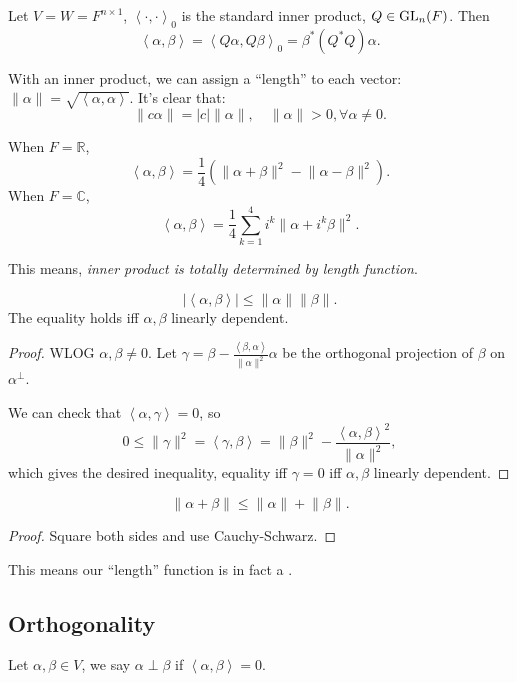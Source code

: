 \begin{example}
    Let $V = W = F^{n\times 1}$, $ \left<\cdot, \cdot \right>_0$ is
	the standard inner product, $Q\in \mathrm{GL}_n(F)$.
	Then
	\[
	\left<\alpha, \beta \right> = \left<Q\alpha, Q\beta \right>_0
	= \beta^*(Q^*Q)\alpha.
	\]
\end{example}

With an inner product, we can assign a ``length''
to each vector: $ \lVert \alpha \rVert = \sqrt{\left<\alpha,\alpha \right>}$.
It's clear that:
\[
\lVert c\alpha \rVert = |c|\lVert \alpha \rVert, \quad
\lVert \alpha \rVert > 0, \forall \alpha \ne 0.
\]

\begin{proposition}
	When $F = \mathbb{R}$,
	\[
	\left<\alpha, \beta \right> = \frac{1}{4}\left(\lVert \alpha + \beta \rVert^2
	- \lVert \alpha - \beta \rVert^2\right).
	\]
	When $F = \mathbb{C}$,
	\[
	\left<\alpha, \beta \right> = \frac{1}{4} \sum_{k=1}^{4} i^k
	\lVert \alpha + i^k \beta \rVert ^2.
	\]
\end{proposition}
\begin{remark}
    This means, \textit{inner product is totally determined by length function}.
\end{remark}

\begin{proposition}
	\[
	|\left<\alpha, \beta \right>| \le \lVert \alpha \rVert \lVert \beta \rVert.
	\]
	The equality holds iff $\alpha, \beta$ linearly dependent.
\end{proposition}
\begin{proof}[Proof]
    WLOG $\alpha, \beta \ne 0$.
	Let $\gamma = \beta -
	\frac{\left<\beta, \alpha \right>}{\lVert \alpha \rVert ^2}\alpha$ be
	the orthogonal projection of $\beta$ on $\alpha^{\perp}$.

	We can check that $ \left<\alpha, \gamma \right> = 0$, so
	\[
	0 \le \lVert \gamma \rVert^2 = \left<\gamma, \beta\right>
	= \lVert \beta \rVert ^2 -
	\frac{\left<\alpha, \beta \right>^2}{\lVert \alpha \rVert ^2},
	\]
	which gives the desired inequality,
	equality iff $\gamma = 0$ iff $\alpha, \beta$ linearly dependent.
\end{proof}

\begin{proposition}
	\[
	\lVert \alpha + \beta \rVert \le \lVert \alpha \rVert + \lVert \beta \rVert.
	\]
\end{proposition}
\begin{proof}[Proof]
    Square both sides and use Cauchy-Schwarz.
\end{proof}

This means our ``length'' function is in fact a .

\subsection{Orthogonality}
\label{sub:Orthogonality}

\begin{definition}[Orthogonality]
	Let $\alpha,\beta\in V$, we say $\alpha \perp \beta$ if
	$\left<\alpha, \beta \right> = 0$.
\end{definition}
